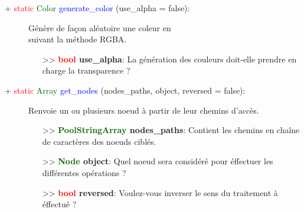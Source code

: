 \documentclass[a4paper, 11pt]{article}
\begin{document}
	\begin{description}
		\item [+ \textcolor{red}{static} \textcolor{darkgreen}{Color} \textcolor{blue}{generate\_color} 
		(use\_alpha = false):] Génère de façon aléatoire une coleur en \\suivant la méthode RGBA.
		\begin{itemize}
			\item [>> \textbf{\textcolor{red}{bool} use\_alpha}:] La génération des couleurs doit-elle 
			prendre en charge la transparence ?\\
		\end{itemize}
	\end{description}
	\begin{description}
		\item [+ \textcolor{red}{static} \textcolor{darkgreen}{Array} \textcolor{blue}{get\_nodes} 
		(nodes\_paths, object, reversed = false):] Renvoie un ou plusieurs noeud à partir de leur chemins 
		d'accès.
		\begin{itemize}
			\item [>> \textbf{\textcolor{darkgreen}{PoolStringArray} nodes\_paths}:] Contient les chemins en 
			chaîne de caractères des noeuds ciblés.
			\item [>> \textbf{\textcolor{darkgreen}{Node} object}:] Quel noeud sera considéré pour éffectuer
			les différentes opérations ?
			\item [>> \textbf{\textcolor{red}{bool} reversed}:] Voulez-vous inverser le sens du traitement à 
			éffectué ?\\
		\end{itemize}
	\end{description}
\end{document}
